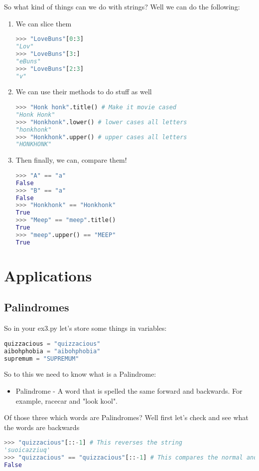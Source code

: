 \documentclass{article}
\begin{document}
So what kind of things can we do with strings? Well we can do the following:
\begin{enumerate}
\item We can slice them
\begin{lstlisting}[language=Python]
>>> "LoveBuns"[0:3]
"Lov"
>>> "LoveBuns"[3:]
"eBuns"
>>> "LoveBuns"[2:3]
"v"
\end{lstlisting}
\item We can use their methods to do stuff as well
\begin{lstlisting}[language=Python]
>>> "Honk honk".title() # Make it movie cased
"Honk Honk"
>>> "Honkhonk".lower() # lower cases all letters
"honkhonk"
>>> "Honkhonk".upper() # upper cases all letters
"HONKHONK"
\end{lstlisting}
\item Then finally, we can, compare them!
\begin{lstlisting}[language=Python]
>>> "A" == "a"
False
>>> "B" == "a"
False
>>> "Honkhonk" == "Honkhonk"
True
>>> "Meep" == "meep".title()
True
>>> "meep".upper() == "MEEP"
True
\end{lstlisting}
\end{enumerate}
\section{Applications}
\subsection{Palindromes}
So in your ex3.py let's store some things in variables:
\begin{lstlisting}[language=Python]
quizzacious = "quizzacious"
aibohphobia = "aibohphobia"
supremum = "SUPREMUM"
\end{lstlisting}

So to this we need to know what is a Palindrome:
\begin{itemize}
\item Palindrome - A word that is spelled the same forward and backwards. For example, racecar and "look kool".
\end{itemize}

Of those three which words are Palindromes? Well first let's check and see what the words 
are backwards
\begin{lstlisting}[language=Python]
>>> "quizzacious"[::-1] # This reverses the string
'suoicazziuq'
>>> "quizzacious" == "quizzacious"[::-1] # This compares the normal and reversed
False
\end{lstlisting}
\end{document}
